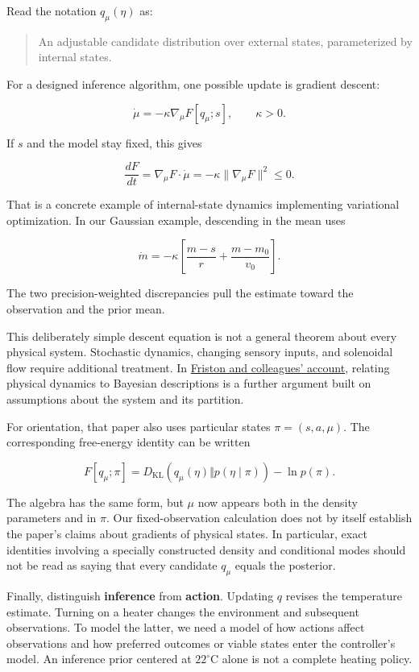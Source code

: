 \documentclass[
  letterpaper,
  DIV=11,
  numbers=noendperiod]{scrreprt}
\begin{document}
Read the notation \(q_\mu(\eta)\) as:

\begin{quote}
An adjustable candidate distribution over external states, parameterized
by internal states.
\end{quote}

For a designed inference algorithm, one possible update is gradient
descent:

\[
\dot\mu=-\kappa\nabla_\mu F[q_\mu;s],
\qquad\kappa>0.
\]

If \(s\) and the model stay fixed, this gives

\[
\frac{dF}{dt}
=\nabla_\mu F\cdot\dot\mu
=-\kappa\|\nabla_\mu F\|^2\leq0.
\]

That is a concrete example of internal-state dynamics implementing
variational optimization. In our Gaussian example, descending in the
mean uses

\[
\dot m=-\kappa\left[\frac{m-s}{r}+\frac{m-m_0}{v_0}\right].
\]

The two precision-weighted discrepancies pull the estimate toward the
observation and the prior mean.

This deliberately simple descent equation is not a general theorem about
every physical system. Stochastic dynamics, changing sensory inputs, and
solenoidal flow require additional treatment. In
\href{https://arxiv.org/abs/2201.06387}{Friston and colleagues'
account}, relating physical dynamics to Bayesian descriptions is a
further argument built on assumptions about the system and its
partition.

For orientation, that paper also uses particular states
\(\pi=(s,a,\mu)\). The corresponding free-energy identity can be written

\[
F[q_\mu;\pi]=D_{\mathrm{KL}}\!\left(q_\mu(\eta)\Vert p(\eta\mid\pi)\right)-\ln p(\pi).
\]

The algebra has the same form, but \(\mu\) now appears both in the
density parameters and in \(\pi\). Our fixed-observation calculation
does not by itself establish the paper's claims about gradients of
physical states. In particular, exact identities involving a specially
constructed density and conditional modes should not be read as saying
that every candidate \(q_\mu\) equals the posterior.

Finally, distinguish \textbf{inference} from \textbf{action}. Updating
\(q\) revises the temperature estimate. Turning on a heater changes the
environment and subsequent observations. To model the latter, we need a
model of how actions affect observations and how preferred outcomes or
viable states enter the controller's model. An inference prior centered
at \(22^\circ\mathrm C\) alone is not a complete heating policy.
\end{document}

